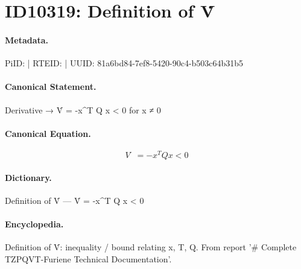 \section*{ID10319: Definition of V̇}
\paragraph{Metadata.}
PiID:  | RTEID:  | UUID: 81a6bd84-7ef8-5420-90c4-b503c64b31b5

\paragraph{Canonical Statement.}
Derivative → V̇ = -x\textasciicircum{}T Q x < 0 for x ≠ 0

\paragraph{Canonical Equation.}
\[
V̇ = -x^T Q x < 0
\]

\paragraph{Dictionary.}
Definition of V̇ — V̇ = -x\textasciicircum{}T Q x < 0

\paragraph{Encyclopedia.}
Definition of V̇: inequality / bound relating x, T, Q. From report '\# Complete TZPQVT-Furiene Technical Documentation'.
